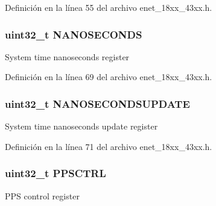 Definición en la línea 55 del archivo enet\+\_\+18xx\+\_\+43xx.\+h.

\subsubsection[{\texorpdfstring{N\+A\+N\+O\+S\+E\+C\+O\+N\+DS}{NANOSECONDS}}]{ uint32\+\_\+t N\+A\+N\+O\+S\+E\+C\+O\+N\+DS}\hypertarget{struct_l_p_c___e_n_e_t___t_a509bec0d8aa03269d5e7f53eadad7fa0}{}\label{struct_l_p_c___e_n_e_t___t_a509bec0d8aa03269d5e7f53eadad7fa0}
System time nanoseconds register 

Definición en la línea 69 del archivo enet\+\_\+18xx\+\_\+43xx.\+h.

\subsubsection[{\texorpdfstring{N\+A\+N\+O\+S\+E\+C\+O\+N\+D\+S\+U\+P\+D\+A\+TE}{NANOSECONDSUPDATE}}]{ uint32\+\_\+t N\+A\+N\+O\+S\+E\+C\+O\+N\+D\+S\+U\+P\+D\+A\+TE}\hypertarget{struct_l_p_c___e_n_e_t___t_ad72537d69dabab83f2b00dff9592498f}{}\label{struct_l_p_c___e_n_e_t___t_ad72537d69dabab83f2b00dff9592498f}
System time nanoseconds update register 

Definición en la línea 71 del archivo enet\+\_\+18xx\+\_\+43xx.\+h.

\subsubsection[{\texorpdfstring{P\+P\+S\+C\+T\+RL}{PPSCTRL}}]{ uint32\+\_\+t P\+P\+S\+C\+T\+RL}\hypertarget{struct_l_p_c___e_n_e_t___t_ad8f64bc7ac1581c660e982efe0763c3c}{}\label{struct_l_p_c___e_n_e_t___t_ad8f64bc7ac1581c660e982efe0763c3c}
P\+PS control register 

